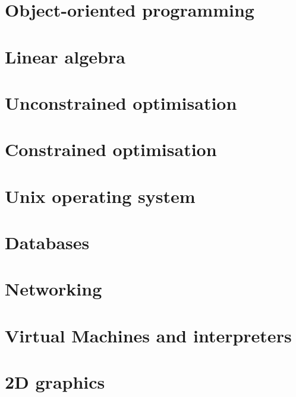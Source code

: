 \documentclass[oneside]{book}
\begin{document}
\part{Object-oriented programming}




\part{Linear algebra}









\part{Unconstrained optimisation}





\part{Constrained optimisation}


\part{Unix operating system}



\part{Databases}


\part{Networking}

\part{Virtual Machines and interpreters}





\part{2D graphics}





\end{document}
